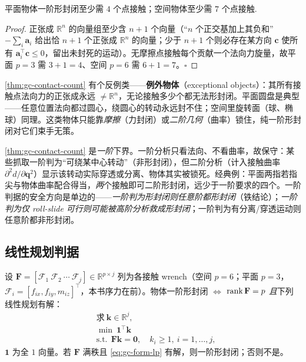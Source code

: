 \begin{theorem}[一阶形封闭的接触数下界]
\label{thm:gc-contact-count}
平面物体一阶形封闭至少需 $4$ 个点接触；空间物体至少需 $7$ 个点接触\cite{lynch2017modern}.
\end{theorem}
\begin{proof}
正张成 $\mathbb{R}^n$ 的向量组至少含 $n+1$ 个向量（“$n$ 个正交基加上其负和” $-\sum_i\mathbf{a}_i$ 给出恰 $n+1$ 个正张成 $\mathbb{R}^n$ 的向量；少于 $n+1$ 个则必存在某方向 $\mathbf{c}$ 使所有 $\mathbf{a}_i^\top\mathbf{c}\le0$，留出未封死的运动）。无摩擦点接触每个贡献一个法向力旋量，故平面 $p=3$ 需 $3+1=4$、空间 $p=6$ 需 $6+1=7$。$\square$
\end{proof}

\begin{note}
\cref{thm:gc-contact-count} 有个反例类——\textbf{例外物体}（exceptional objects）：其所有接触点法向力的正张成永远 $\ne\mathbb{R}^n$，无论接触多少个都无法形封闭。平面圆盘是典型——任意位置法向都过圆心，绕圆心的转动永远封不住；空间里旋转面（球、椭球）同理。这类物体只能靠\emph{摩擦}（力封闭）或\emph{二阶几何}（曲率）锁住，纯一阶形封闭对它们束手无策。
\end{note}

\begin{note}
\cref{thm:gc-contact-count} 是\emph{一阶}下界。一阶分析只看法向、不看曲率，故保守：某些抓取一阶判为“可绕某中心转动”（非形封闭），但二阶分析（计入接触曲率 $\partial^2 d/\partial\mathbf{q}^2$）显示该转动实际穿透或分离、物体其实被锁死。经典例：平面两指若指尖与物体曲率配合得当，\emph{两}个接触即可二阶形封闭，远少于一阶要求的四个\cite{lynch2017modern}。一阶判据的安全方向是单边的——\emph{一阶判为形封闭则任意阶都形封闭}（铁结论）；\emph{一阶判为仅 roll-slide 可行则可能被高阶分析救成形封闭}；一阶判为有分离/穿透运动则任意阶都非形封闭。
\end{note}

\subsection{线性规划判据}
\label{sec:gc-fc-form-lp}

\begin{theorem}[一阶形封闭的 LP 判据]
\label{thm:gc-form-lp}
设 $\mathbf{F}=[\mathcal{F}_1\ \mathcal{F}_2\ \cdots\ \mathcal{F}_j]\in\mathbb{R}^{p\times j}$ 列为各接触 wrench（空间 $p=6$；平面 $p=3$，$\mathcal{F}_i=[f_{ix},f_{iy},m_{iz}]^\top$，本书序力在前）。物体一阶形封闭 $\Leftrightarrow$ $\operatorname{rank}\mathbf{F}=p$ \emph{且}下列线性规划有解\cite{lynch2017modern}：
\begin{equation}
  \begin{aligned}
    &\text{求}\ \mathbf{k}\in\mathbb{R}^j,\\
    &\min\ \mathbf{1}^\top\mathbf{k}\\
    &\text{s.t.}\ \ \mathbf{F}\mathbf{k}=\mathbf{0},\quad k_i\ge1,\ i=1,\dots,j,
  \end{aligned}
  \label{eq:gc-form-lp}
\end{equation}
$\mathbf{1}$ 为全 $1$ 向量。若 $\mathbf{F}$ 满秩且 \cref{eq:gc-form-lp} 有解，则一阶形封闭；否则不是。
\end{theorem}

